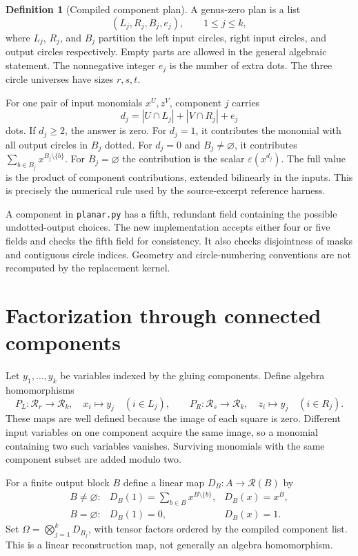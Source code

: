 \documentclass[11pt,letterpaper]{article}
\theoremstyle{definition}
\newtheorem{definition}[theorem]{Definition}
\theoremstyle{remark}
\newcommand{\R}{\mathcal R}
\newcommand{\eps}{\varepsilon}
\begin{document}
\begin{definition}[Compiled component plan]
A genus-zero plan is a list
\[
 (L_j,R_j,B_j,e_j),\qquad 1\leq j\leq k,
\]
where $L_j$, $R_j$, and $B_j$ partition the left input circles, right input
circles, and output circles respectively. Empty parts are allowed in the
general algebraic statement. The nonnegative integer $e_j$ is the number of
extra dots. The three circle universes have sizes $r,s,t$.
\end{definition}

For one pair of input monomials $x^U,z^V$, component $j$ carries
\[
 d_j=|U\cap L_j|+|V\cap R_j|+e_j
\]
dots. If $d_j\geq2$, the answer is zero. For $d_j=1$, it contributes the
monomial with all output circles in $B_j$ dotted. For $d_j=0$ and
$B_j\ne\varnothing$, it contributes
\(\sum_{b\in B_j}x^{B_j\setminus\{b\}}\).
For $B_j=\varnothing$ the contribution is the scalar $\eps(x^{d_j})$.
The full value is the product of component contributions, extended
bilinearly in the inputs. This is precisely the numerical rule used by the
source-excerpt reference harness.

A component in \texttt{planar.py} has a fifth, redundant field containing
the possible undotted-output choices. The new implementation accepts either
four or five fields and checks the fifth field for consistency. It also
checks disjointness of masks and contiguous circle indices. Geometry and
circle-numbering conventions are not recomputed by the replacement kernel.

\section{Factorization through connected components}
\label{sec:factor}
Let $y_1,\ldots,y_k$ be variables indexed by the gluing components. Define
algebra homomorphisms
\[
 P_L:\R_r\longrightarrow\R_k,
 \quad x_i\longmapsto y_j\quad(i\in L_j),
 \qquad
 P_R:\R_s\longrightarrow\R_k,
 \quad z_i\longmapsto y_j\quad(i\in R_j).
\]
These maps are well defined because the image of each square is zero.
Different input variables on one component acquire the same image, so a
monomial containing two such variables vanishes. Surviving monomials with
the same component subset are added modulo two.

For a finite output block $B$ define a linear map
$D_B:A\to\R(B)$ by
\[
\begin{array}{lll}
 B\ne\varnothing:&D_B(1)=\displaystyle\sum_{b\in B}x^{B\setminus\{b\}},
                  &D_B(x)=x^B,\\[0.5em]
 B=\varnothing:&D_B(1)=0,&D_B(x)=1.
\end{array}
\]
Set $\Omega=\bigotimes_{j=1}^k D_{B_j}$, with tensor factors ordered by the
compiled component list. This is a linear reconstruction map, not generally
an algebra homomorphism.
\end{document}
